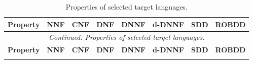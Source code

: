\begin{landscape}
\begin{longtable}{@{}lccccccc@{}}
\caption[Properties of selected target languages.]{Properties of selected target languages.}
\label{tbl:kc_language_properties}\\
\toprule
\textbf{Property} & \textbf{NNF} & \textbf{CNF} & \textbf{DNF} & \textbf{DNNF} & \textbf{d-DNNF} & \textbf{SDD} & \textbf{ROBDD} \\
\midrule
\endfirsthead

\multicolumn{8}{c}{\textit{Continued: Properties of selected target languages.}}\\
\toprule
\textbf{Property} & \textbf{NNF} & \textbf{CNF} & \textbf{DNF} & \textbf{DNNF} & \textbf{d-DNNF} & \textbf{SDD} & \textbf{ROBDD} \\
\midrule
\endhead

\endfoot
\bottomrule
\endlastfoot


\end{longtable}
\end{landscape}
